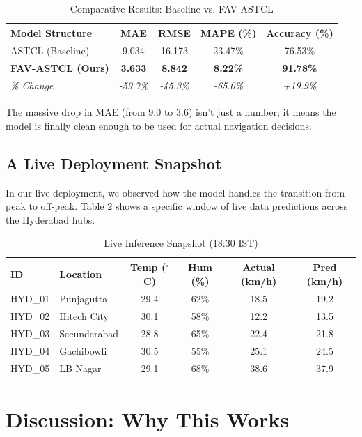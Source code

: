 \documentclass[11pt,a4paper]{article}
\begin{document}
\begin{table}[h]
\centering
\caption{Comparative Results: Baseline vs. FAV-ASTCL}
\vspace{5pt}
\begin{tabular}{lcccc}
\toprule
\textbf{Model Structure} & \textbf{MAE} & \textbf{RMSE} & \textbf{MAPE (\%)} & \textbf{Accuracy (\%)} \\
\midrule
ASTCL (Baseline) & 9.034 & 16.173 & 23.47\% & 76.53\% \\
\textbf{FAV-ASTCL (Ours)} & \textbf{3.633} & \textbf{8.842} & \textbf{8.22\%} & \textbf{91.78\%} \\
\midrule
\textit{\% Change} & \textit{-59.7\%} & \textit{-45.3\%} & \textit{-65.0\%} & \textit{+19.9\%} \\
\bottomrule
\end{tabular}
\end{table}

The massive drop in MAE (from 9.0 to 3.6) isn't just a number; it means the model is finally clean enough to be used for actual navigation decisions.

\subsection{A Live Deployment Snapshot}
In our live deployment, we observed how the model handles the transition from peak to off-peak. Table 2 shows a specific window of live data predictions across the Hyderabad hubs.

\begin{table}[h]
\centering
\caption{Live Inference Snapshot (18:30 IST)}
\vspace{5pt}
\begin{tabular}{llcccc}
\toprule
\textbf{ID} & \textbf{Location} & \textbf{Temp ($^\circ$C)} & \textbf{Hum (\%)} & \textbf{Actual (km/h)} & \textbf{Pred (km/h)} \\
\midrule
HYD\_01 & Punjagutta & 29.4 & 62\% & 18.5 & 19.2 \\
HYD\_02 & Hitech City & 30.1 & 58\% & 12.2 & 13.5 \\
HYD\_03 & Secunderabad & 28.8 & 65\% & 22.4 & 21.8 \\
HYD\_04 & Gachibowli & 30.5 & 55\% & 25.1 & 24.5 \\
HYD\_05 & LB Nagar & 29.1 & 68\% & 38.6 & 37.9 \\
\bottomrule
\end{tabular}
\end{table}

\section{Discussion: Why This Works}
\end{document}
